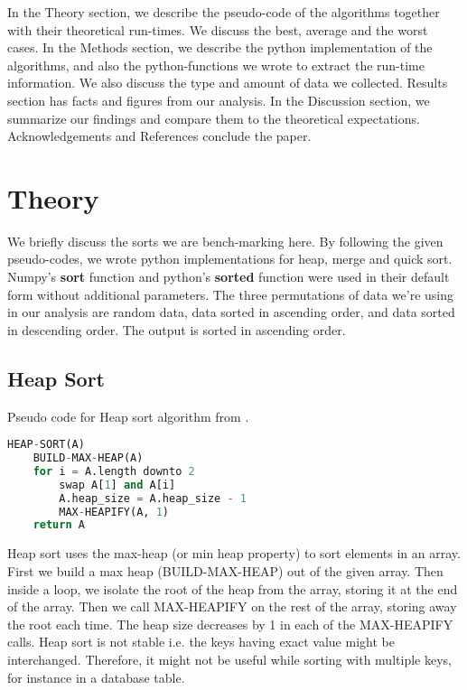 \documentclass[sigconf, nonacm, natbib, screen, balance=False]{acmart}
\begin{document}
In the Theory section, we describe the pseudo-code of the algorithms together with their theoretical run-times. We discuss the best, average and the worst cases.  In the Methods section, we describe the python implementation of the algorithms, and also the python-functions we wrote to extract the run-time information. We also discuss the type and amount of data we collected. Results section has facts and figures from our analysis. In the Discussion section, we summarize our findings and compare them to the theoretical expectations. Acknowledgements and References conclude the paper.

\section{Theory}\label{sec:theory}
We briefly discuss the sorts we are bench-marking here. By following the given pseudo-codes, we wrote python implementations for heap, merge and quick sort. Numpy's \textbf{sort} function and python's \textbf{sorted} function were used in their default form without additional parameters. The three permutations of data we're using in our analysis are random data, data sorted in ascending order, and data sorted in descending order. The output is sorted in ascending order.

\subsection{Heap Sort}\label{sec:heap sort}

\begin{listing}
\caption{Pseudo code for Heap sort algorithm from \citet[Ch.~6.4]{CLRS_2009}.}
\label{lst:heap_algo}
\begin{lstlisting}[language=Python]
HEAP-SORT(A)
    BUILD-MAX-HEAP(A)
    for i = A.length downto 2
        swap A[1] and A[i]
        A.heap_size = A.heap_size - 1
        MAX-HEAPIFY(A, 1)
    return A
\end{lstlisting}
\end{listing}

Heap sort uses the max-heap (or min heap property) to sort elements in an array. First we build a max heap (BUILD-MAX-HEAP) out of the given array. Then inside a loop, we isolate the root of the heap from the array, storing it at the end of the array. Then we call MAX-HEAPIFY on the rest of the array, storing away the root each time. The heap size decreases by 1 in each of the MAX-HEAPIFY calls. Heap sort is not stable i.e. the keys having exact value might be interchanged. Therefore, it might not be useful while sorting with multiple keys, for instance in a database table.
\end{document}

